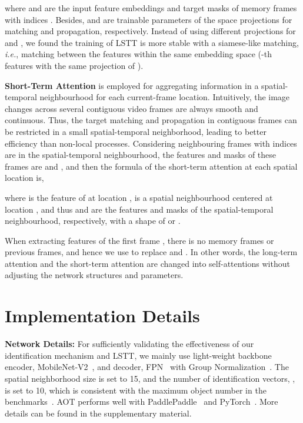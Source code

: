 \documentclass{article}
\def\ie{\emph{i.e.}}
\begin{document}
where  and  are the input feature embeddings and target masks of memory frames with indices . Besides,  and  are trainable parameters of the space projections for matching and propagation, respectively. Instead of using different projections for  and , we found the training of LSTT is more stable with a siamese-like matching, \ie, matching between the features within the same embedding space (-th features with the same projection of ).

\noindent\textbf{Short-Term Attention} is employed for aggregating information in a spatial-temporal neighbourhood for each current-frame location. Intuitively, the image changes across several contiguous video frames are always smooth and continuous. Thus, the target matching and propagation in contiguous frames can be restricted in a small spatial-temporal neighborhood, leading to better efficiency than non-local processes. Considering  neighbouring frames with indices  are in the spatial-temporal neighbourhood, the features and masks of these frames are  and , and then the formula of the short-term attention at each spatial location  is,

where  is the feature of  at location ,  is a  spatial neighbourhood centered at location , and thus  and  are the features and masks of the spatial-temporal neighbourhood, respectively, with a shape of  or . 


When extracting features of the first frame , there is no memory frames or previous frames, and hence we use  to replace  and . In other words, the long-term attention and the short-term attention are changed into self-attentions without adjusting the network structures and parameters.
 
\section{Implementation Details}\label{sec:implementation}

\noindent\textbf{Network Details:} For sufficiently validating the effectiveness of our identification mechanism and LSTT, we mainly use light-weight backbone encoder, MobileNet-V2~\cite{sandler2018mobilenetv2}, and decoder, FPN~\cite{fpn} with Group Normalization~\cite{gn}. The spatial neighborhood size  is set to 15, and the number of identification vectors, , is set to 10, which is consistent with the maximum object number in the benchmarks~\cite{youtubevos,davis2017}. AOT performs well with PaddlePaddle~\cite{paddlepaddle} and PyTorch~\cite{pytorch}. 
More details can be found in the supplementary material.
\end{document}
